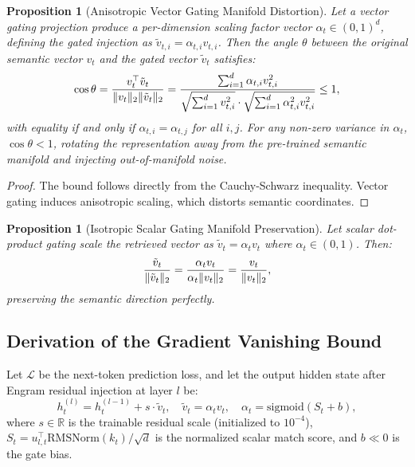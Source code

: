 \documentclass[11pt]{article}
\newtheorem{proposition}[theorem]{Proposition}
\newcommand{\RMS}{\mathrm{RMSNorm}}
\newcommand{\sigmoid}{\mathrm{sigmoid}}
\DeclarePairedDelimiter{\norm}{\lVert}{\rVert}
\begin{document}
\begin{proposition}[Anisotropic Vector Gating Manifold Distortion]
Let a vector gating projection produce a per-dimension scaling factor vector $\alpha_t \in (0,1)^d$, defining the gated injection as $\tilde{v}_{t,i} = \alpha_{t,i} v_{t,i}$. Then the angle $\theta$ between the original semantic vector $v_t$ and the gated vector $\tilde{v}_t$ satisfies:
\begin{equation}
\cos\theta = \frac{v_t^\top \tilde{v}_t}{\norm{v_t}_2 \norm{\tilde{v}_t}_2} = \frac{\sum_{i=1}^d \alpha_{t,i} v_{t,i}^2}{\sqrt{\sum_{i=1}^d v_{t,i}^2} \cdot \sqrt{\sum_{i=1}^d \alpha_{t,i}^2 v_{t,i}^2}} \leq 1,
\end{equation}
with equality if and only if $\alpha_{t,i} = \alpha_{t,j}$ for all $i,j$. For any non-zero variance in $\alpha_t$, $\cos\theta < 1$, rotating the representation away from the pre-trained semantic manifold and injecting out-of-manifold noise.
\end{proposition}

\begin{proof}
The bound follows directly from the Cauchy-Schwarz inequality. Vector gating induces anisotropic scaling, which distorts semantic coordinates.
\end{proof}

\begin{proposition}[Isotropic Scalar Gating Manifold Preservation]
Let scalar dot-product gating scale the retrieved vector as $\tilde{v}_t = \alpha_t v_t$ where $\alpha_t \in (0,1)$. Then:
\begin{equation}
\frac{\tilde{v}_t}{\norm{\tilde{v}_t}_2} = \frac{\alpha_t v_t}{\alpha_t \norm{v_t}_2} = \frac{v_t}{\norm{v_t}_2},
\end{equation}
preserving the semantic direction perfectly.
\end{proposition}

\subsection{Derivation of the Gradient Vanishing Bound}

Let $\mathcal{L}$ be the next-token prediction loss, and let the output hidden state after Engram residual injection at layer $l$ be:
\begin{equation}
h_t^{(l)} = h_t^{(l-1)} + s \cdot \tilde{v}_t, \quad \tilde{v}_t = \alpha_t v_t, \quad \alpha_t = \sigmoid(S_t + b),
\end{equation}
where $s \in \mathbb{R}$ is the trainable residual scale (initialized to $10^{-4}$), $S_t = u_{l,t}^\top \RMS(k_t) / \sqrt{d}$ is the normalized scalar match score, and $b \ll 0$ is the gate bias.
\end{document}
